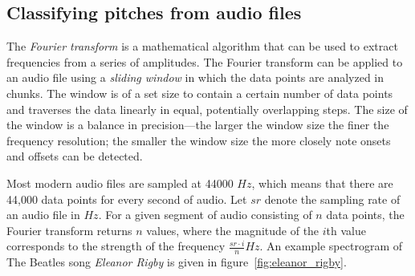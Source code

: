\subsection{Classifying pitches from audio files}

The \textit{Fourier transform} is a mathematical algorithm that can be used to extract frequencies from a series of amplitudes. The Fourier transform can be applied to an audio file using a \textit{sliding window} in which the data points are analyzed in chunks. The window is of a set size to contain a certain number of data points and traverses the data linearly in equal, potentially overlapping steps. The size of the window is a balance in precision---the larger the window size the finer the frequency resolution; the smaller the window size the more closely note onsets and offsets can be detected.

Most modern audio files are sampled at 44000 $Hz$, which means that there are 44,000 data points for every second of audio. Let $sr$ denote the sampling rate of an audio file in $Hz$. For a given segment of audio consisting of $n$ data points, the Fourier transform returns $n$ values, where the magnitude of the $i$th value corresponds to the strength of the frequency $\frac{sr \cdot i}{n}Hz$. An example spectrogram of The Beatles song \textit{Eleanor Rigby} is given in figure~\ref{fig:eleanor_rigby}.


